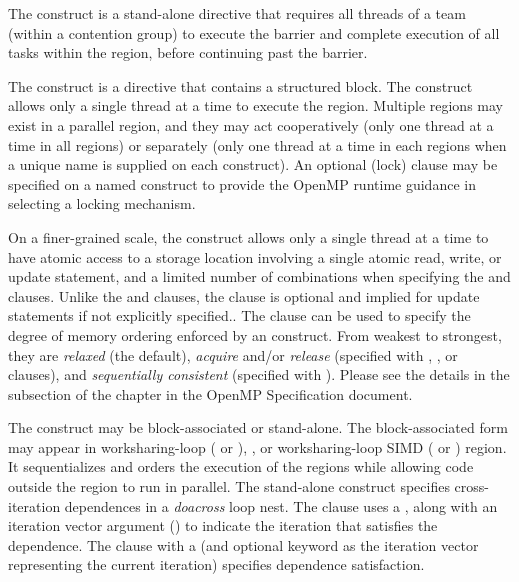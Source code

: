 \label{chap:synchronization}

The  construct is a stand-alone directive that requires all threads
of a team (within a contention group) to execute the barrier and complete
execution of all tasks within the region, before continuing past the barrier.

The  construct is a directive that contains a structured block. 
The construct allows only a single thread at a time to execute the region.
Multiple  regions may exist in a parallel region, and they may act
cooperatively (only one thread at a time in all  regions) or
separately (only one thread at a time in each  regions when a
unique name is supplied on each  construct). An optional (lock)
 clause may be specified on a named  construct to
provide the OpenMP runtime guidance in selecting a locking mechanism.

On a finer-grained scale, the  construct allows only a single
thread at a time to have atomic access to a storage location involving a single
atomic read, write, or update statement, and a limited number of combinations
when specifying the  and  
clauses.  Unlike the  and   clauses, the
  clause is optional and implied for update
statements if not explicitly specified.. The  clause can be
used to specify the degree of memory ordering enforced by an 
construct. From weakest to strongest, they are \emph{relaxed} (the default),
\emph{acquire} and/or \emph{release} (specified with ,
, or  clauses), and \emph{sequentially consistent}
(specified with ).  Please see the details in the  subsection of the 
chapter in the OpenMP Specification document.

The  construct may be block-associated or stand-alone. The
block-associated form may appear in worksharing-loop ( or
), , or worksharing-loop SIMD ( or
) region. It sequentializes and orders the execution of the
 regions while allowing code outside the region to run in
parallel. The stand-alone  construct specifies cross-iteration
dependences in a \emph{doacross} loop nest. The  clause uses a
 , along with an iteration vector argument
() to indicate the iteration that satisfies the dependence.  The
 clause with a   (and
optional  keyword as the iteration vector
representing the current iteration) specifies dependence satisfaction.

